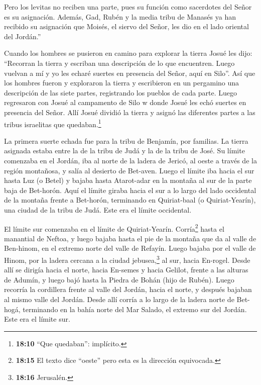  Pero los levitas no reciben una parte, pues su función como
sacerdotes del Señor es su asignación. Además, Gad, Rubén y la media
tribu de Manasés ya han recibido su asignación que Moisés, el siervo del
Señor, les dio en el lado oriental del Jordán.''

 Cuando los hombres se pusieron en camino para explorar la
tierra Josué les dijo: ``Recorran la tierra y escriban una descripción
de lo que encuentren. Luego vuelvan a mí y yo les echaré suertes en
presencia del Señor, aquí en Silo''.  Así que los hombres
fueron y exploraron la tierra y escribieron en un pergamino una
descripción de las siete partes, registrando los pueblos de cada parte.
Luego regresaron con Josué al campamento de Silo  w donde
Josué les echó suertes en presencia del Señor. Allí Josué dividió la
tierra y asignó las diferentes partes a las tribus israelitas que
quedaban.\footnote{\textbf{18:10} ``Que quedaban'': implícito.}

 La primera suerte echada fue para la tribu de Benjamín,
por familias. La tierra asignada estaba entre la de la tribu de Judá y
la de la tribu de José.  Su límite comenzaba en el Jordán,
iba al norte de la ladera de Jericó, al oeste a través de la región
montañosa, y salía al desierto de Bet-aven.  Luego el
límite iba hacia el sur hasta Luz (o Betel) y bajaba hasta Atarot-adar
en la montaña al sur de la parte baja de Bet-horón.  Aquí
el límite giraba hacia el sur a lo largo del lado occidental de la
montaña frente a Bet-horón, terminando en Quiriat-baal (o
Quiriat-Yearín), una ciudad de la tribu de Judá. Este era el límite
occidental.

 El límite sur comenzaba en el límite de Quiriat-Yearín.
Corría\footnote{\textbf{18:15} El texto dice ``oeste'' pero esta es la
  dirección equivocada.} hasta el manantial de Neftoa,  y
luego bajaba hasta el pie de la montaña que da al valle de Ben-hinom, en
el extremo norte del valle de Refayín. Luego bajaba por el valle de
Hinom, por la ladera cercana a la ciudad jebusea,\footnote{\textbf{18:16}
  Jerusalén.} al sur, hacia En-rogel.  Desde allí se
dirigía hacia el norte, hacia En-semes y hacia Gelilot, frente a las
alturas de Adumín, y luego bajó hasta la Piedra de Bohán (hijo de
Rubén).  Luego recorría la cordillera frente al valle del
Jordán, hacia el norte, y después bajaban al mismo valle del Jordán.
 Desde allí corría a lo largo de la ladera norte de
Bet-hogá, terminando en la bahía norte del Mar Salado, el extremo sur
del Jordán. Este era el límite sur.

